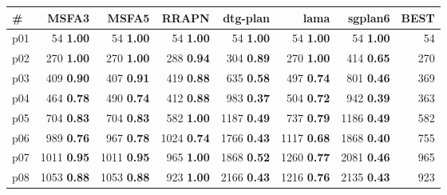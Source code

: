 \begin{tabular}{lrrrrrrr}
\toprule
\textbf{\#} & \textbf{MSFA3} & \textbf{MSFA5} & \textbf{RRAPN} & \textbf{dtg-plan} & \textbf{lama} & \textbf{sgplan6} & \textbf{BEST}\\
\midrule
\multicolumn{1}{l|}{p01} & {\footnotesize 54} \textbf{1.00} & {\footnotesize 54} \textbf{1.00} & {\footnotesize 54} \textbf{1.00} & {\footnotesize 54} \textbf{1.00} & {\footnotesize 54} \textbf{1.00} & {\footnotesize 54} \textbf{1.00} & \multicolumn{1}{|r}{54}\\
\multicolumn{1}{l|}{p02} & {\footnotesize 270} \textbf{1.00} & {\footnotesize 270} \textbf{1.00} & {\footnotesize 288} \textbf{0.94} & {\footnotesize 304} \textbf{0.89} & {\footnotesize 270} \textbf{1.00} & {\footnotesize 414} \textbf{0.65} & \multicolumn{1}{|r}{270}\\
\multicolumn{1}{l|}{p03} & {\footnotesize 409} \textbf{0.90} & {\footnotesize 407} \textbf{0.91} & {\footnotesize 419} \textbf{0.88} & {\footnotesize 635} \textbf{0.58} & {\footnotesize 497} \textbf{0.74} & {\footnotesize 801} \textbf{0.46} & \multicolumn{1}{|r}{369}\\
\multicolumn{1}{l|}{p04} & {\footnotesize 464} \textbf{0.78} & {\footnotesize 490} \textbf{0.74} & {\footnotesize 412} \textbf{0.88} & {\footnotesize 983} \textbf{0.37} & {\footnotesize 504} \textbf{0.72} & {\footnotesize 942} \textbf{0.39} & \multicolumn{1}{|r}{363}\\
\multicolumn{1}{l|}{p05} & {\footnotesize 704} \textbf{0.83} & {\footnotesize 704} \textbf{0.83} & {\footnotesize 582} \textbf{1.00} & {\footnotesize 1187} \textbf{0.49} & {\footnotesize 737} \textbf{0.79} & {\footnotesize 1186} \textbf{0.49} & \multicolumn{1}{|r}{582}\\
\multicolumn{1}{l|}{p06} & {\footnotesize 989} \textbf{0.76} & {\footnotesize 967} \textbf{0.78} & {\footnotesize 1024} \textbf{0.74} & {\footnotesize 1766} \textbf{0.43} & {\footnotesize 1117} \textbf{0.68} & {\footnotesize 1868} \textbf{0.40} & \multicolumn{1}{|r}{755}\\
\multicolumn{1}{l|}{p07} & {\footnotesize 1011} \textbf{0.95} & {\footnotesize 1011} \textbf{0.95} & {\footnotesize 965} \textbf{1.00} & {\footnotesize 1868} \textbf{0.52} & {\footnotesize 1260} \textbf{0.77} & {\footnotesize 2081} \textbf{0.46} & \multicolumn{1}{|r}{965}\\
\multicolumn{1}{l|}{p08} & {\footnotesize 1053} \textbf{0.88} & {\footnotesize 1053} \textbf{0.88} & {\footnotesize 923} \textbf{1.00} & {\footnotesize 2166} \textbf{0.43} & {\footnotesize 1216} \textbf{0.76} & {\footnotesize 2135} \textbf{0.43} & \multicolumn{1}{|r}{923}\\

\end{tabular}
